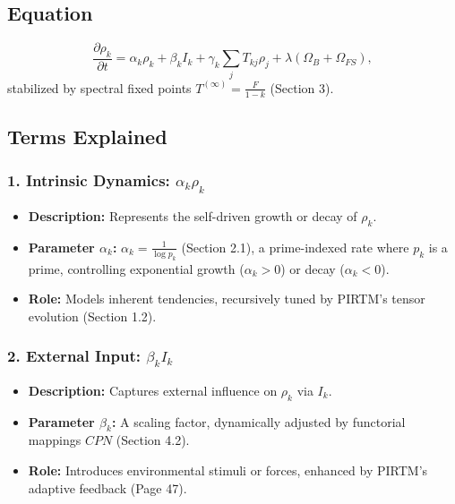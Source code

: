 \documentclass{article}
\theoremstyle{plain}
\begin{document}
\subsection*{Equation}
\begin{equation}
\frac{\partial \rho_k}{\partial t} = \alpha_k \rho_k + \beta_k I_k + \gamma_k \sum_j T_{kj} \rho_j + \lambda (\Omega_B + \Omega_{FS}),
\end{equation}
stabilized by spectral fixed points \( T^{(\infty)} = \frac{F}{1 - k} \) (Section 3).

\subsection{Terms Explained}

\subsubsection{1. Intrinsic Dynamics: \(\alpha_k \rho_k\)}
\begin{itemize}
    \item \textbf{Description:} Represents the self-driven growth or decay of \( \rho_k \).
    \item \textbf{Parameter \(\alpha_k\):} \( \alpha_k = \frac{1}{\log p_k} \) (Section 2.1), a prime-indexed rate where \( p_k \) is a prime, controlling exponential growth (\( \alpha_k > 0 \)) or decay (\( \alpha_k < 0 \)).
    \item \textbf{Role:} Models inherent tendencies, recursively tuned by PIRTM’s tensor evolution (Section 1.2).
\end{itemize}

\subsubsection{2. External Input: \(\beta_k I_k\)}
\begin{itemize}
    \item \textbf{Description:} Captures external influence on \( \rho_k \) via \( I_k \).
    \item \textbf{Parameter \(\beta_k\):} A scaling factor, dynamically adjusted by functorial mappings \( CPN \) (Section 4.2).
    \item \textbf{Role:} Introduces environmental stimuli or forces, enhanced by PIRTM’s adaptive feedback (Page 47).
\end{itemize}
\end{document}
